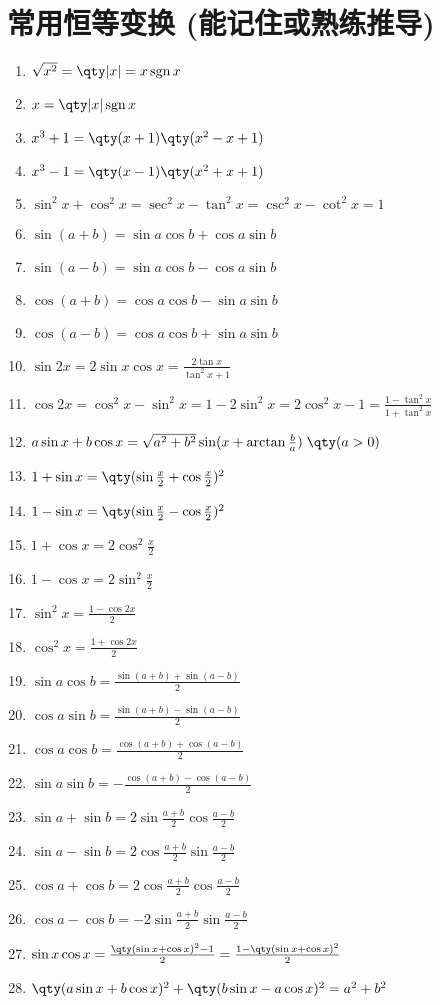 \documentclass{ctexbook}
\DeclareMathOperator{\sgn}{sgn}
\begin{document}
{\section{常用恒等变换 (能记住或熟练推导) }
\begin{enumerate}
\item$\sqrt{x^{2}}=\qty|x|=x\sgn{x}$
\item$x=\qty|x|\sgn{x}$
\item$x^{3}+1=\qty(x+1)\qty(x^{2}-x+1)$
\item$x^{3}-1=\qty(x-1)\qty(x^{2}+x+1)$
\item$\sin^{2}{x}+\cos^{2}{x}=\sec^{2}{x}-\tan^{2}{x}=\csc^{2}{x}-\cot^{2}{x}=1$
\item$\sin(a+b)=\sin{a}\cos{b}+\cos{a}\sin{b}$
\item$\sin(a-b)=\sin{a}\cos{b}-\cos{a}\sin{b}$
\item$\cos(a+b)=\cos{a}\cos{b}-\sin{a}\sin{b}$
\item$\cos(a-b)=\cos{a}\cos{b}+\sin{a}\sin{b}$
\item$\sin{2x}=2\sin{x}\cos{x}=\frac{2\tan{x}}{\tan^{2}{x}+1}$
\item$\cos{2x}=\cos^{2}{x}-\sin^{2}{x}=1-2\sin^{2}{x}=2\cos^{2}{x}-1=\frac{1-\tan^{2}{x}}{1+\tan^{2}{x}}$
\item$a\sin{x}+b\cos{x}=\sqrt{a^{2}+b^{2}}\sin(x+\arctan{\frac{b}{a}})\;\qty(a>0)$
\item$1+\sin{x}=\qty(\sin{\frac{x}{2}}+\cos{\frac{x}{2}})^{2}$
\item$1-\sin{x}=\qty(\sin{\frac{x}{2}}-\cos{\frac{x}{2}})^{2}$
\item$1+\cos{x}=2\cos^{2}{\frac{x}{2}}$
\item$1-\cos{x}=2\sin^{2}{\frac{x}{2}}$
\item$\sin^{2}{x}=\frac{1-\cos{2x}}{2}$
\item$\cos^{2}{x}=\frac{1+\cos{2x}}{2}$
\item$\sin{a}\cos{b}=\frac{\sin(a+b)+\sin(a-b)}{2}$
\item$\cos{a}\sin{b}=\frac{\sin(a+b)-\sin(a-b)}{2}$
\item$\cos{a}\cos{b}=\frac{\cos(a+b)+\cos(a-b)}{2}$
\item$\sin{a}\sin{b}=-\frac{\cos(a+b)-\cos(a-b)}{2}$
\item$\sin{a}+\sin{b}=2\sin{\frac{a+b}{2}}\cos{\frac{a-b}{2}}$
\item$\sin{a}-\sin{b}=2\cos{\frac{a+b}{2}}\sin{\frac{a-b}{2}}$
\item$\cos{a}+\cos{b}=2\cos{\frac{a+b}{2}}\cos{\frac{a-b}{2}}$
\item$\cos{a}-\cos{b}=-2\sin{\frac{a+b}{2}}\sin{\frac{a-b}{2}}$
\item$\sin{x}\cos{x}=\frac{\qty(\sin{x}+\cos{x})^{2}-1}{2}=\frac{1-\qty(\sin{x}+\cos{x})^{2}}{2}$
\item$\qty(a\sin{x}+b\cos{x})^{2}+\qty(b\sin{x}-a\cos{x})^{2}=a^{2}+b^{2}$
\end{enumerate}
}
\end{document}
